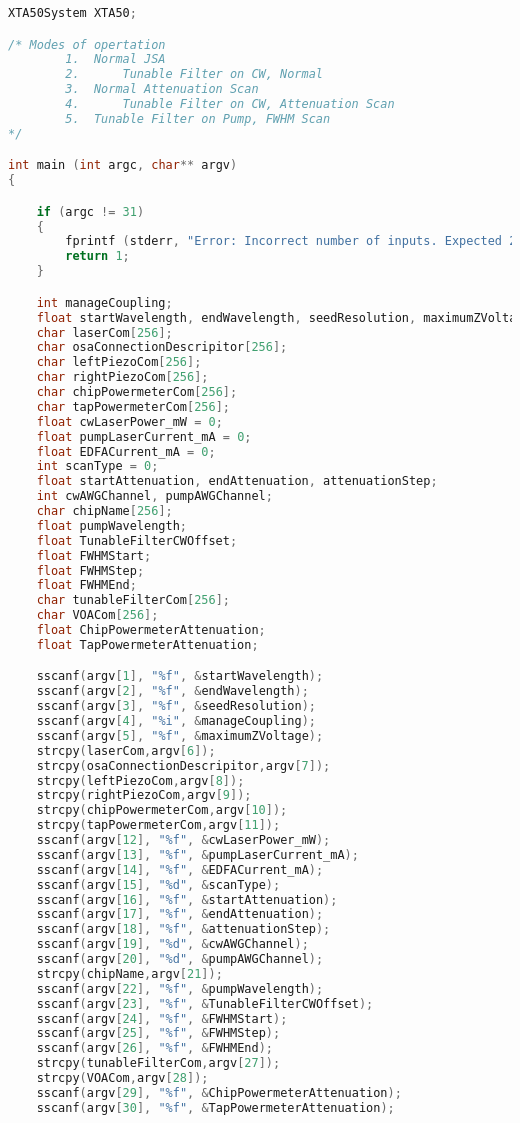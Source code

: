 \begin{lstlisting}[style=customc, language=C]
XTA50System XTA50;

/* Modes of opertation
        1.  Normal JSA
        2.      Tunable Filter on CW, Normal
        3.  Normal Attenuation Scan
        4.      Tunable Filter on CW, Attenuation Scan
        5.  Tunable Filter on Pump, FWHM Scan
*/

int main (int argc, char** argv)
{

	if (argc != 31)
	{
		fprintf (stderr, "Error: Incorrect number of inputs. Expected 22, received %i.\n", argc-1);
		return 1;
	}

    int manageCoupling;
    float startWavelength, endWavelength, seedResolution, maximumZVoltage;
    char laserCom[256];
    char osaConnectionDescripitor[256];
    char leftPiezoCom[256];
    char rightPiezoCom[256];
    char chipPowermeterCom[256];
    char tapPowermeterCom[256];
    float cwLaserPower_mW = 0;
    float pumpLaserCurrent_mA = 0;
    float EDFACurrent_mA = 0;
    int scanType = 0;
    float startAttenuation, endAttenuation, attenuationStep;
    int cwAWGChannel, pumpAWGChannel;
    char chipName[256];
    float pumpWavelength;
    float TunableFilterCWOffset;
    float FWHMStart;
    float FWHMStep;
    float FWHMEnd;
    char tunableFilterCom[256];
    char VOACom[256];
    float ChipPowermeterAttenuation;
    float TapPowermeterAttenuation;

    sscanf(argv[1], "%f", &startWavelength);
    sscanf(argv[2], "%f", &endWavelength);
    sscanf(argv[3], "%f", &seedResolution);
    sscanf(argv[4], "%i", &manageCoupling);
    sscanf(argv[5], "%f", &maximumZVoltage);
    strcpy(laserCom,argv[6]);
    strcpy(osaConnectionDescripitor,argv[7]);
    strcpy(leftPiezoCom,argv[8]);
    strcpy(rightPiezoCom,argv[9]);
    strcpy(chipPowermeterCom,argv[10]);
    strcpy(tapPowermeterCom,argv[11]);
    sscanf(argv[12], "%f", &cwLaserPower_mW);
    sscanf(argv[13], "%f", &pumpLaserCurrent_mA);
    sscanf(argv[14], "%f", &EDFACurrent_mA);
    sscanf(argv[15], "%d", &scanType);
    sscanf(argv[16], "%f", &startAttenuation);
    sscanf(argv[17], "%f", &endAttenuation);
    sscanf(argv[18], "%f", &attenuationStep);
    sscanf(argv[19], "%d", &cwAWGChannel);
    sscanf(argv[20], "%d", &pumpAWGChannel);
    strcpy(chipName,argv[21]);
    sscanf(argv[22], "%f", &pumpWavelength);
    sscanf(argv[23], "%f", &TunableFilterCWOffset);
    sscanf(argv[24], "%f", &FWHMStart);
    sscanf(argv[25], "%f", &FWHMStep);
    sscanf(argv[26], "%f", &FWHMEnd);
    strcpy(tunableFilterCom,argv[27]);
    strcpy(VOACom,argv[28]);
    sscanf(argv[29], "%f", &ChipPowermeterAttenuation);
    sscanf(argv[30], "%f", &TapPowermeterAttenuation);


\end{lstlisting}
